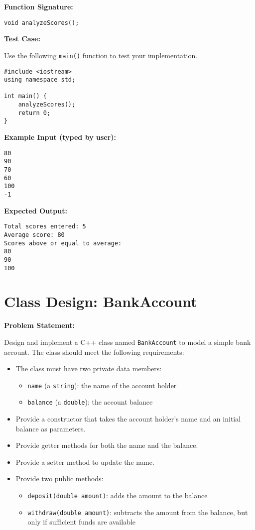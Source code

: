 \documentclass{article}
\begin{document}
\textbf{Function Signature:}

\begin{lstlisting}[style=cppstyle]
void analyzeScores();
\end{lstlisting}

\textbf{Test Case:}

Use the following \texttt{main()} function to test your implementation.

\begin{lstlisting}[style=cppstyle]
#include <iostream>
using namespace std;

int main() {
    analyzeScores();
    return 0;
}
\end{lstlisting}

\textbf{Example Input (typed by user):}
\begin{verbatim}
80
90
70
60
100
-1
\end{verbatim}

\textbf{Expected Output:}
\begin{verbatim}
Total scores entered: 5
Average score: 80
Scores above or equal to average:
80
90
100
\end{verbatim}



\section{Class Design: BankAccount}

\textbf{Problem Statement:}

Design and implement a C++ class named \texttt{BankAccount} to model a simple bank account. The class should meet the following requirements:

\begin{itemize}
  \item The class must have two private data members:
    \begin{itemize}
      \item \texttt{name} (a \texttt{string}): the name of the account holder
      \item \texttt{balance} (a \texttt{double}): the account balance
    \end{itemize}
  \item Provide a constructor that takes the account holder's name and an initial balance as parameters.
  \item Provide getter methods for both the name and the balance.
  \item Provide a setter method to update the name.
  \item Provide two public methods:
    \begin{itemize}
      \item \texttt{deposit(double amount)}: adds the amount to the balance
      \item \texttt{withdraw(double amount)}: subtracts the amount from the balance, but only if sufficient funds are available
    \end{itemize}
\end{itemize}
\end{document}
